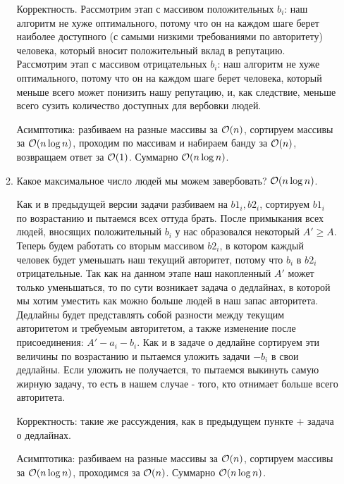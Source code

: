 \begin{enumerate}
\begin{enumerate}
\begin{solution}
            Корректность. Рассмотрим этап с массивом положительных $b_i$: наш алгоритм не хуже оптимального, потому что он на каждом шаге берет наиболее доступного (с самыми низкими требованиями по авторитету) человека, который вносит положительный вклад в репутацию. Рассмотрим этап с массивом отрицательных $b_i$: наш алгоритм не хуже оптимального, потому что он на каждом шаге берет человека, который меньше всего может понизить нашу репутацию, и, как следствие, меньше всего сузить количество доступных для вербовки людей.

            Асимптотика: разбиваем на разные массивы за $\mathcal{O}(n)$, сортируем массивы за $\mathcal{O}(n \log n)$, проходим по массивам и набираем банду за $\mathcal{O}(n)$, возвращаем ответ за $\mathcal{O}(1)$. Суммарно $\mathcal{O}(n \log n)$.
        \end{solution}

		\item Какое максимальное число людей мы можем завербовать? $\mathcal{O}(n \log n)$.
		
        \begin{solution}
            Как и в предыдущей версии задачи разбиваем на $b1_i, b2_i$, сортируем $b1_i$ по возрастанию и пытаемся всех оттуда брать. После примыкания всех людей, вносящих положительный $b_i$ у нас образовался некоторый $A' \geq A$. Теперь будем работать со вторым массивом $b2_i$, в котором каждый человек будет уменьшать наш текущий авторитет, потому что $b_i$ в $b2_i$ отрицательные. Так как на данном этапе наш накопленный $A'$ может только уменьшаться, то по сути возникает задача о дедлайнах, в которой мы хотим уместить как можно больше людей в наш запас авторитета. Дедлайны будет представлять собой разности между текущим авторитетом и требуемым авторитетом, а также изменение после присоединения: $A' - a_i - b_i$. Как и в задаче о дедлайне сортируем эти величины по возрастанию и пытаемся уложить задачи $-b_i$ в свои дедлайны. Если уложить не получается, то пытаемся выкинуть самую жирную задачу, то есть в нашем случае - того, кто отнимает больше всего авторитета.

            Корректность: такие же рассуждения, как в предыдущем пункте + задача о дедлайнах.

            Асимптотика: разбиваем на разные массивы за $\mathcal{O}(n)$, сортируем массивы за $\mathcal{O}(n \log n)$, проходимся за $\mathcal{O}(n)$. Суммарно $\mathcal{O}(n \log n)$.
        \end{solution}
	\end{enumerate}




\end{enumerate}
